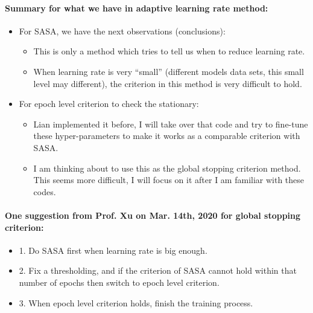 \paragraph{Summary for what we have in adaptive learning rate method:}
\begin{itemize}
	\item For SASA, we have the next observations (conclusions):
	\begin{itemize}
		\item This is only a method which tries to tell us when to reduce learning rate.
		\item When learning rate is very ``small'' (different models data sets, this small level may different), the criterion in this method is very difficult to hold. 
	\end{itemize}
	\item For epoch level criterion to check the stationary:
	\begin{itemize}
		\item Lian implemented it before, I will take over that code and try to fine-tune these hyper-parameters to make it works as a comparable criterion with SASA.
		\item I am thinking about to use this as the global stopping criterion method. This seems more difficult, I will focus on it after I am familiar with these codes.
	\end{itemize}
\end{itemize}

\paragraph{One suggestion from Prof. Xu on Mar. 14th, 2020 for global stopping criterion:}
\begin{itemize}
	\item 1. Do SASA first when learning rate is big enough.
	\item 2. Fix a thresholding, and if the criterion of SASA cannot hold within that number of epochs then switch to epoch level criterion.
	\item 3. When epoch level criterion holds, finish the training process.
\end{itemize}

